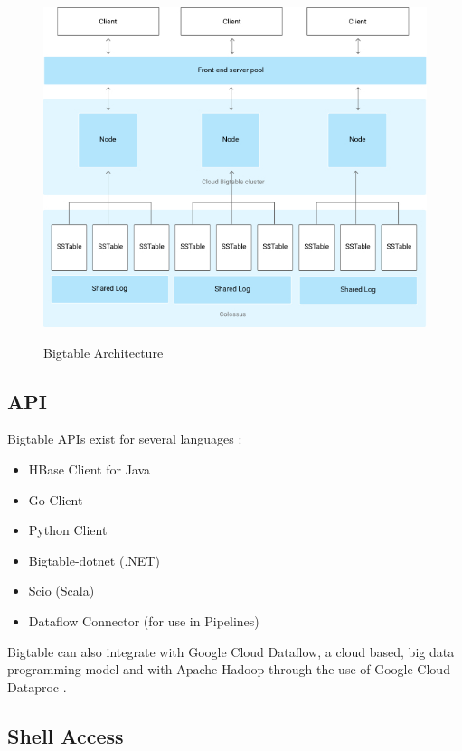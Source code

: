 \documentclass[9pt,twocolumn,twoside]{styles/osajnl}
\begin{document}
\begin{figure}[ht]
  \includegraphics[scale=0.45]{images/bigtable-architecture.jpg}
  \caption{Bigtable Architecture} \cite{www-bigtabledocoverview}
\end{figure}

\subsection{API}

Bigtable APIs exist for several languages \cite{www-bigtabledocapi}:

\vspace{-\topsep}
\begin{itemize}
\item HBase Client for Java
\item Go Client
\item Python Client
\item Bigtable-dotnet (.NET)
\item Scio (Scala)
\item Dataflow Connector (for use in Pipelines)
\end{itemize}

Bigtable can also integrate with Google Cloud Dataflow, a cloud based, big data programming model and with Apache Hadoop through the use of Google Cloud Dataproc \cite{www-bigtabledocapi}.

\subsection{Shell Access}
\end{document}
